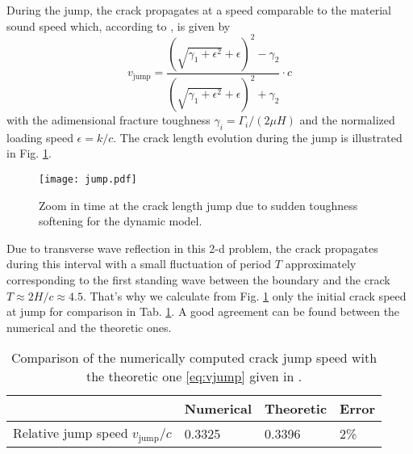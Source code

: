 During the jump, the crack propagates at a speed comparable to the material sound speed which, according to \cite{DumouchelMarigoCharlotte:2008}, is given by
\begin{equation} \label{eq:vjump}
v_\mathrm{jump}=\frac{\left(\sqrt{\gamma_1+\epsilon^2}+\epsilon\right)^2-\gamma_2}{\left(\sqrt{\gamma_1+\epsilon^2}+\epsilon\right)^2+\gamma_2}\cdot c
\end{equation}
with the adimensional fracture toughness $\gamma_i=\Gamma_i/(2\mu H)$ and the normalized loading speed $\epsilon=k/c$. The crack length evolution during the jump is illustrated in Fig. \ref{fig:softGcqs_jump}.
\begin{figure}[htbp]
\centering
\texttt{[image: jump.pdf]}
\caption{Zoom in time at the crack length jump due to sudden toughness softening for the dynamic model.} \label{fig:softGcqs_jump}
\end{figure}
Due to transverse wave reflection in this 2-d problem, the crack propagates during this interval with a small fluctuation of period $T$ approximately corresponding to the first standing wave between the boundary and the crack $T\approx 2H/c\approx 4.5$. That's why we calculate from Fig. \ref{fig:softGcqs_jump} only the initial crack speed at jump for comparison in Tab. \ref{tab:compjumpv}. A good agreement can be found between the numerical and the theoretic ones.
\begin{table}[htbp]
\centering
\caption{Comparison of the numerically computed crack jump speed with the theoretic one \eqref{eq:vjump} given in \cite{DumouchelMarigoCharlotte:2008}.} \label{tab:compjumpv}
\begin{tabular}{llll} \toprule
& Numerical & Theoretic & Error \\ \midrule
Relative jump speed $v_\mathrm{jump}/c$ & 0.3325 & 0.3396 & 2\% \\ \bottomrule
\end{tabular}
\end{table}


